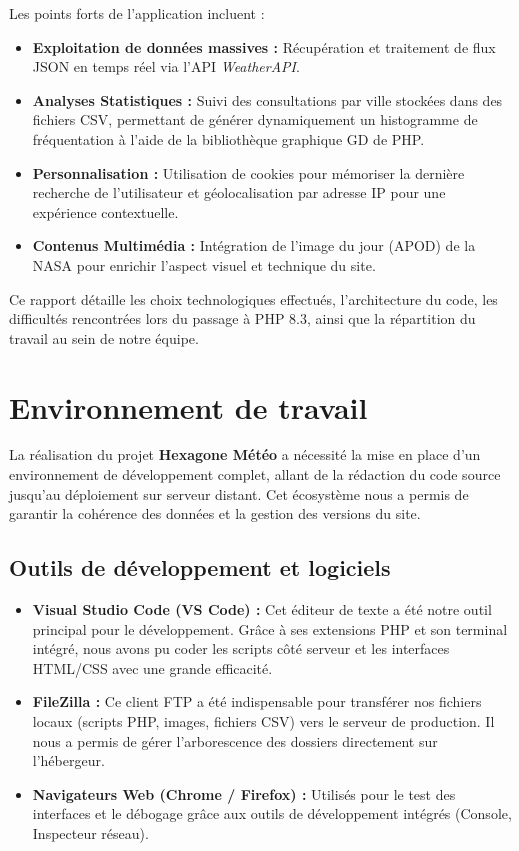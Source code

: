 \documentclass[12pt,a4paper]{article}
\begin{document}
Les points forts de l'application incluent :
\begin{itemize}
    \item \textbf{Exploitation de données massives :} Récupération et traitement de flux JSON en temps réel via l'API \textit{WeatherAPI}.
    \item \textbf{Analyses Statistiques :} Suivi des consultations par ville stockées dans des fichiers CSV, permettant de générer dynamiquement un histogramme de fréquentation à l'aide de la bibliothèque graphique GD de PHP.
    \item \textbf{Personnalisation :} Utilisation de cookies pour mémoriser la dernière recherche de l'utilisateur et géolocalisation par adresse IP pour une expérience contextuelle.
    \item \textbf{Contenus Multimédia :} Intégration de l'image du jour (APOD) de la NASA pour enrichir l'aspect visuel et technique du site.
\end{itemize}

Ce rapport détaille les choix technologiques effectués, l'architecture du code, les difficultés rencontrées lors du passage à PHP 8.3, ainsi que la répartition du travail au sein de notre équipe.

\vfill
{} \par 
\newpage

\section{Environnement de travail}

La réalisation du projet \textbf{Hexagone Météo} a nécessité la mise en place d'un environnement de développement complet, allant de la rédaction du code source jusqu'au déploiement sur serveur distant. Cet écosystème nous a permis de garantir la cohérence des données et la gestion des versions du site.

\subsection{Outils de développement et logiciels}
\begin{itemize}
    \item \textbf{Visual Studio Code (VS Code) :} Cet éditeur de texte a été notre outil principal pour le développement. Grâce à ses extensions PHP et son terminal intégré, nous avons pu coder les scripts côté serveur et les interfaces HTML/CSS avec une grande efficacité.
    \item \textbf{FileZilla :} Ce client FTP a été indispensable pour transférer nos fichiers locaux (scripts PHP, images, fichiers CSV) vers le serveur de production. Il nous a permis de gérer l'arborescence des dossiers directement sur l'hébergeur.
    \item \textbf{Navigateurs Web (Chrome / Firefox) :} Utilisés pour le test des interfaces et le débogage grâce aux outils de développement intégrés (Console, Inspecteur réseau).
\end{itemize}
\end{document}
